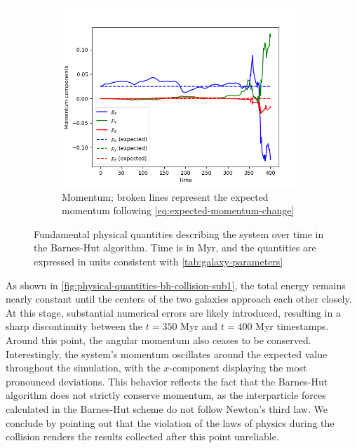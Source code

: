 \begin{figure}[!ht]
    \vspace{0.2cm}

    \begin{subfigure}[b]{0.45\textwidth}
        \centering
        \includegraphics[width=\textwidth]{chapters/results/img/bh-collision/momentum.png}
        \caption{Momentum; broken lines represent the expected momentum following \autoref{eq:expected-momentum-change}}
        \label{fig:physical-quantities-bh-collision-sub3}
    \end{subfigure}

    \caption{Fundamental physical quantities describing the system over time in the Barnes-Hut algorithm.
        Time is in Myr, and the quantities are expressed in units consistent with \autoref{tab:galaxy-parameters}}
    \label{fig:physical-quantities-bh-collision}
\end{figure}

As shown in \autoref{fig:physical-quantities-bh-collision-sub1}, the total energy remains nearly constant until the centers of the two galaxies approach each other closely. At this stage, substantial numerical errors are likely introduced, resulting in a sharp discontinuity between the $t = 350$ Myr and $t = 400$ Myr timestamps.
Around this point, the angular momentum also ceases to be conserved.
Interestingly, the system's momentum oscillates around the expected value throughout the simulation, with the $x$-component displaying the most pronounced deviations.
This behavior reflects the fact that the Barnes-Hut algorithm does not strictly conserve momentum, as the interparticle forces calculated in the Barnes-Hut scheme do not follow Newton's third law.
We conclude by pointing out that the violation of the laws of physics during the collision renders the results collected after this point unreliable.

